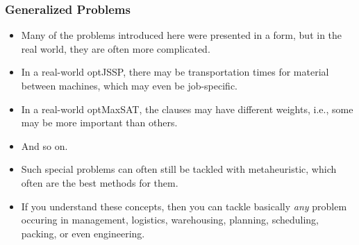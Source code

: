 \documentclass[aspectratio=169,mathserif,notheorems]{beamer}%
\begin{document}
\begin{frame}%
\frametitle{Generalized Problems}%
\begin{itemize}%
\item Many of the problems introduced here were presented in a  form, but in the real world, they are often more complicated.%
\item<2-> In a real-world \gls{optJSSP}, there may be transportation times for material between machines, which may even be job-specific.%
\item<3-> In a real-world \gls{optMaxSAT}, the clauses may have different weights, i.e., some may be more important than others.%
\item<4-> And so on.%
\item<5-> Such special problems can often still be tackled with \gls{metaheuristic}, which often are the best methods for them.%
\item<6-> If you understand these concepts, then you can tackle basically \emph{any} problem occuring in management, logistics, warehousing, planning, scheduling, packing, or even engineering.%
\end{itemize}%
\end{frame}%
%
%
%
%
\endPresentation%
\end{document}
